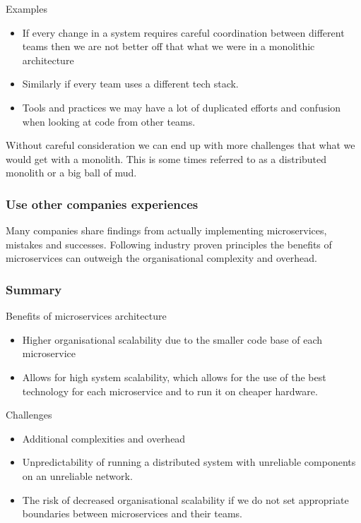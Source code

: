 \documentclass[a4paper, 11pt]{book}
\begin{document}
    Examples
    \begin{itemize}
        \item If every change in a system requires careful coordination between different teams then we are not better off that what we were in a monolithic architecture
        \item Similarly if every team uses a different tech stack.
        \item Tools and practices we may have a lot of duplicated efforts and confusion when looking at code from other teams.
    \end{itemize}

    Without careful consideration we can end up with more challenges that what we would get with a monolith.
    This is some times referred to as a distributed monolith or a big ball of mud.

    \subsubsection{Use other companies experiences}
    Many companies share findings from actually implementing microservices, mistakes and successes.
    Following industry proven principles the benefits of microservices can outweigh the organisational complexity and overhead.

    \subsubsection{Summary}
    Benefits of microservices architecture

    \begin{itemize}
        \item Higher organisational scalability due to the smaller code base of each microservice
        \item Allows for high system scalability, which allows for the use of the best technology for each microservice and to run it on cheaper hardware.
    \end{itemize}

    Challenges
    \begin{itemize}
        \item Additional complexities and overhead
        \item Unpredictability of running a distributed system with unreliable components on an unreliable network.
        \item The risk of decreased organisational scalability if we do not set appropriate boundaries between microservices and their teams.
    \end{itemize}
\end{document}
